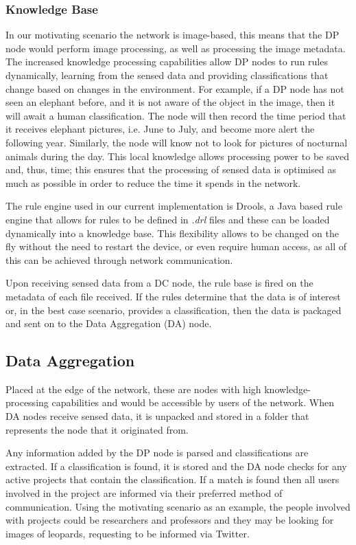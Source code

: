 	\subsubsection{Knowledge Base}
	In our motivating scenario the network is image-based, this means that the DP node would perform image processing, as well as processing the image metadata. The increased knowledge processing capabilities allow DP nodes to run rules dynamically, learning from the sensed data and providing classifications that change based on changes in the environment. For example, if a DP node has not seen an elephant before, and it is not aware of the object in the image, then it will await a human classification. The node will then record the time period that it receives elephant pictures, i.e. June to July, and become more alert the following year. Similarly, the node will know not to look for pictures of nocturnal animals during the day. This local knowledge allows processing power to be saved and, thus, time; this ensures that the processing of sensed data is optimised as much as possible in order to reduce the time it spends in the network.
	
	The rule engine used in our current implementation is Drools, a Java based rule engine that allows for rules to be defined in \textit{.drl} files and these can be loaded dynamically into a knowledge base. This flexibility allows to be changed on the fly without the need to restart the device, or even require human access, as all of this can be achieved through network communication. 
	
	Upon receiving sensed data from a DC node, the rule base is fired on the metadata of each file received. If the rules determine that the data is of interest or, in the best case scenario, provides a classification, then the data is packaged and sent on to the Data Aggregation (DA) node.
	
	\subsection{Data Aggregation}
	Placed at the edge of the network, these are nodes with high knowledge-processing capabilities and would be accessible by users of the network. When DA nodes receive sensed data, it is unpacked and stored in a folder that represents the node that it originated from. 
	
	Any information added by the DP node is parsed and classifications are extracted. If a classification is found, it is stored and the DA node checks for any active projects that contain the classification. If a match is found then all users involved in the project are informed via their preferred method of communication. Using the motivating scenario as an example, the people involved with projects could be researchers and professors and they may be looking for images of leopards, requesting to be informed via Twitter.
	

